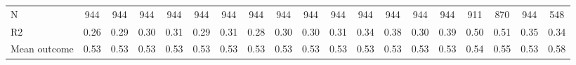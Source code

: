 \begin{tabular}{lcccccccccccccccccc}
N           &         944         &         944         &         944         &         944         &         944         &         944         &         944         &         944         &         944         &         944         &         944         &         944         &         944         &         944         &         911         &         870         &         944         &         548         \\
R2          &        0.26         &        0.29         &        0.30         &        0.31         &        0.29         &        0.31         &        0.28         &        0.30         &        0.30         &        0.31         &        0.34         &        0.38         &        0.30         &        0.39         &        0.50         &        0.51         &        0.35         &        0.34         \\
Mean outcome&        0.53         &        0.53         &        0.53         &        0.53         &        0.53         &        0.53         &        0.53         &        0.53         &        0.53         &        0.53         &        0.53         &        0.53         &        0.53         &        0.53         &        0.54         &        0.55         &        0.53         &        0.58         \\
\bottomrule \end{tabular}
